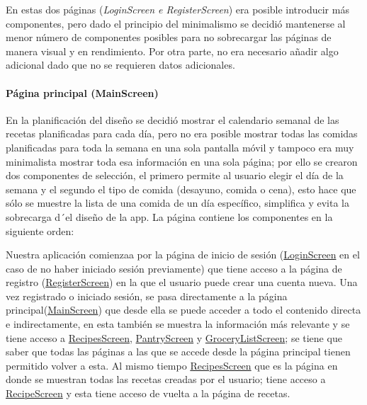 \documentclass[twoside, openright, 11pt]{report}
\begin{document}
		En estas dos páginas (\textit{LoginScreen e RegisterScreen}) era posible introducir más componentes, pero dado el principio del minimalismo se decidió mantenerse al menor número de componentes posibles para no sobrecargar las páginas de manera visual y en rendimiento. Por otra parte, no era necesario añadir algo adicional dado que no se requieren datos adicionales.
		
		\paragraph{Página principal (MainScreen)}
		En la planificación del diseño se decidió mostrar el calendario semanal de las recetas planificadas para cada día, pero no era posible mostrar todas las comidas planificadas para toda la semana en una sola pantalla móvil y tampoco era muy minimalista mostrar toda esa información en una sola página; por ello se crearon dos componentes de selección, el primero permite al usuario elegir el día de la semana y el segundo el tipo de comida (desayuno, comida o cena), esto hace que sólo se muestre la lista de una comida de un día específico, simplifica y evita la sobrecarga d´el diseño de la app.
		La página contiene los componentes en la siguiente orden:
		
		
		Nuestra aplicación comienzaa por la página de inicio de sesión (\hyperref[LoginScreen]{LoginScreen} en el caso de no haber iniciado sesión previamente) que tiene acceso a la página de registro (\hyperref[RegisterScreen]{RegisterScreen}) en la que el usuario puede crear una cuenta nueva. Una vez registrado o iniciado sesión, se pasa directamente a la página principal(\hyperref[MainScreen]{MainScreen}) que desde ella se puede acceder a todo el contenido directa e indirectamente, en esta también se muestra la información más relevante y se tiene acceso a \hyperref[RecipesScreen]{RecipesScreen}, \hyperref[PantryScreen]{PantryScreen} y \hyperref[GroceryListScreen]{GroceryListScreen}; se tiene que saber que todas las páginas a las que se accede desde la página principal tienen permitido volver a esta.
		Al mismo tiempo \hyperref[RecipesScreen]{RecipesScreen} que es la página en donde se muestran todas las recetas creadas por el usuario; tiene acceso a \hyperref[RecipeScreen]{RecipeScreen} y esta tiene acceso de vuelta a la página de recetas.
		
\end{document}
